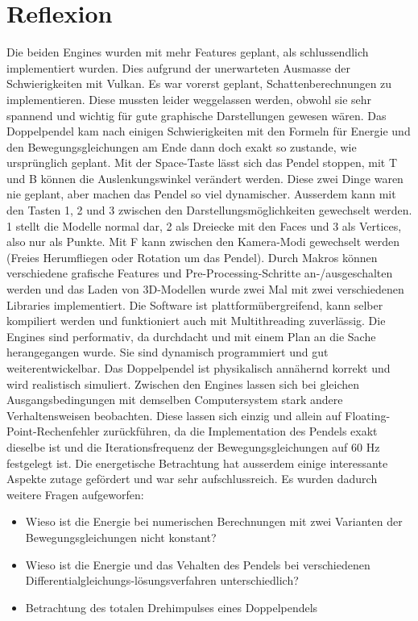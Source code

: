 \documentclass[titlepage, 11pt, a4paper, ngerman]{article}
\begin{document}
\section{Reflexion}
Die beiden \glspl{Engine} wurden mit mehr Features geplant, als schlussendlich implementiert wurden. Dies aufgrund der unerwarteten Ausmasse der Schwierigkeiten mit Vulkan. Es war vorerst geplant, Schattenberechnungen zu implementieren. Diese mussten leider weggelassen werden, obwohl sie sehr spannend und wichtig für gute graphische Darstellungen gewesen wären. Das Doppelpendel kam nach einigen Schwierigkeiten mit den Formeln für Energie und den Bewegungsgleichungen am Ende dann doch exakt so zustande, wie ursprünglich geplant. Mit der Space-Taste lässt sich das Pendel stoppen, mit T und B können die Auslenkungswinkel verändert werden. Diese zwei Dinge waren nie geplant, aber machen das Pendel so viel dynamischer. Ausserdem kann mit den Tasten 1, 2 und 3 zwischen den Darstellungsmöglichkeiten gewechselt werden. 1 stellt die Modelle normal dar, 2 als Dreiecke mit den \glspl{Face} und 3 als \gls{Vertices}, also nur als Punkte. Mit F kann zwischen den Kamera-Modi gewechselt werden (Freies Herumfliegen oder Rotation um das Pendel). Durch Makros können verschiedene grafische Features und Pre-Processing-Schritte an-/ausgeschalten werden und das Laden von 3D-Modellen wurde zwei Mal mit zwei verschiedenen Libraries implementiert. Die Software ist plattformübergreifend, kann selber kompiliert werden und funktioniert auch mit \gls{Multithreading} zuverlässig. Die \glspl{Engine} sind performativ, da durchdacht und mit einem Plan an die Sache herangegangen wurde. Sie sind dynamisch programmiert und gut weiterentwickelbar. Das Doppelpendel ist physikalisch annähernd korrekt und wird realistisch simuliert. Zwischen den Engines lassen sich bei gleichen Ausgangsbedingungen mit demselben Computersystem stark andere Verhaltensweisen beobachten. Diese lassen sich einzig und allein auf \gls{Floating-Point}-Rechenfehler zurückführen, da die Implementation des Pendels exakt dieselbe ist und die Iterationsfrequenz der Bewegungsgleichungen auf 60 Hz festgelegt ist. Die energetische Betrachtung hat ausserdem einige interessante Aspekte zutage gefördert und war sehr aufschlussreich. Es wurden dadurch weitere Fragen aufgeworfen:
\begin{itemize}
    \item Wieso ist die Energie bei numerischen Berechnungen mit zwei Varianten der Bewegungsgleichungen nicht konstant?
    \item Wieso ist die Energie und das Vehalten des Pendels bei verschiedenen Differentialgleichungs-lösungsverfahren unterschiedlich?
    \item Betrachtung des totalen Drehimpulses eines Doppelpendels
\end{itemize}
\end{document}
